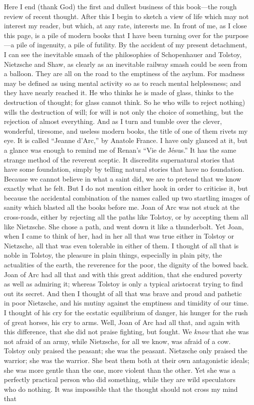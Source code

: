 \documentclass{book}
\begin{document}
Here I end (thank God) the first and dullest business of this book—the rough review of recent thought. After this I begin to sketch a view of life which may not interest my reader, but which, at any rate, interests me. In front of me, as I close this page, is a pile of modern books that I have been turning over for the purpose—a pile of ingenuity, a pile of futility. By the accident of my present detachment, I can see the inevitable smash of the philosophies of Schopenhauer and Tolstoy, Nietzsche and Shaw, as clearly as an inevitable railway smash could be seen from a balloon. They are all on the road to the emptiness of the asylum. For madness may be defined as using mental activity so as to reach mental helplessness; and they have nearly reached it. He who thinks he is made of glass, thinks to the destruction of thought; for glass cannot think. So he who wills to reject nothing) wills the destruction of will; for will is not only the choice of something, but the rejection of almost everything. And as I turn and tumble over the clever, wonderful, tiresome, and useless modern books, the title of one of them rivets my eye. It is called “Jeanne d’Arc,” by Anatole France. I have only glanced at it, but a glance was enough to remind me of Renan’s “Vie de Jésus.” It has the same strange method of the reverent sceptic. It discredits supernatural stories that have some foundation, simply by telling natural stories that have no foundation. Because we cannot believe in what a saint did, we are to pretend that we know exactly what he felt. But I do not mention either hook in order to criticise it, but because the accidental combination of the names called up two startling images of sanity which blasted all the books before me. Joan of Arc was not stuck at the cross-roads, either by rejecting all the paths like Tolstoy, or by accepting them all like Nietzsche. She chose a path, and went down it like a thunderbolt. Yet Joan, when I came to think of her, had in her all that was true either in Tolstoy or Nietzsche, all that was even tolerable in either of them. I thought of all that is noble in Tolstoy, the pleasure in plain things, especially in plain pity, the actualities of the earth, the reverence for the poor, the dignity of the bowed back. Joan of Arc had all that and with this great addition, that she endured poverty as well as admiring it; whereas Tolstoy is only a typical aristocrat trying to find out its secret. And then I thought of all that was brave and proud and pathetic in poor Nietzsche, and his mutiny against the emptiness and timidity of our time. I thought of his cry for the ecstatic equilibrium of danger, his hunger for the rush of great horses, his cry to arms. Well, Joan of Arc had all that, and again with this difference, that she did not praise fighting, but fought. We \emph{know} that she was not afraid of an army, while Nietzsche, for all we know, was afraid of a cow. Tolstoy only praised the peasant; she was the peasant. Nietzsche only praised the warrior; she was the warrior. She beat them both at their own antagonistic ideals; she was more gentle than the one, more violent than the other. Yet she was a perfectly practical person who did something, while they are wild speculators who do nothing. It was impossible that the thought should not cross my mind that 
\end{document}
